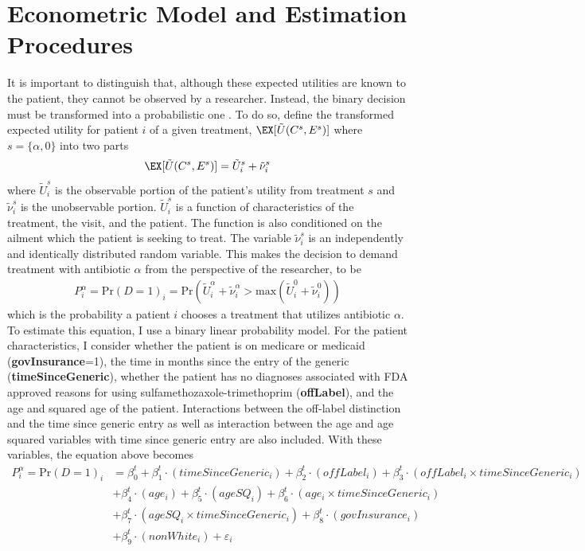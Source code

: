 \section{Econometric Model and Estimation Procedures}
\indent It is important to distinguish that, although these expected utilities are known to the patient, they cannot be observed by a researcher. Instead, the binary decision must be transformed into a probabilistic one \cite{train_discrete_nodate, templeton_household_2008}. To do so, define the transformed expected utility for patient $i$ of a given treatment, $\EX[\tilde{U}(C^s,E^s)]$ where $s = \{\alpha,0\}$ into two parts
\begin{eqnarray}
\EX[\tilde{U}(C^s,E^s)] = \tilde{U}_i^s + \tilde{\nu}_i^s
\end{eqnarray}
where $\tilde{U}_i^s$ is the observable portion of the patient's utility from treatment $s$ and $\tilde{\nu}_i^s$ is the unobservable portion. $\tilde{U}_i^s$ is a function of characteristics of the treatment, the visit, and the patient. The function is also conditioned on the ailment which the patient is seeking to treat. The variable $\tilde{\nu}_i^s$ is an independently and identically distributed random variable. This makes the decision to demand treatment with antibiotic $\alpha$ from the perspective of the researcher, to be
\begin{eqnarray}
P_i^\alpha =\text{Pr}(D = 1)_i = \text{Pr}(\tilde{U}^\alpha_i + \tilde{\nu}^\alpha_i > \text{max}(\tilde{U}^0_i + \tilde{\nu}^0_i))
\end{eqnarray}
which is the probability a patient $i$ chooses a treatment that utilizes antibiotic $\alpha$.\\
\indent To estimate this equation, I use a binary linear probability model. For the patient characteristics, I consider whether the patient is on medicare or medicaid (\textbf{govInsurance}=1), the time in months since the entry of the generic (\textbf{timeSinceGeneric}), whether the patient has no diagnoses associated with FDA approved reasons for using sulfamethozaxole-trimethoprim (\textbf{offLabel}), and the age and squared age of the patient. Interactions between the off-label distinction and the time since generic entry as well as interaction between the age and age squared variables with time since generic entry are also included. With these variables, the equation above becomes
\begin{equation}
\begin{split}
    P_i^\alpha =\text{Pr}(D = 1)_i & = \beta^t_0 + \beta^t_1\cdot(timeSinceGeneric_i) + \beta_2^t\cdot(offLabel_i) + \beta_3^t\cdot(offLabel_i\times timeSinceGeneric_i)\\
    & + \beta_4^t\cdot(age_i) + \beta_5^t\cdot(ageSQ_i)  + \beta_6^t\cdot(age_i\times timeSinceGeneric_i)\\
    & + \beta_7^t\cdot(ageSQ_i\times timeSinceGeneric_i)  + \beta_8^t\cdot(govInsurance_i)\\
    & + \beta_9^t\cdot(nonWhite_i) + \varepsilon_i
\end{split}
\end{equation}\
